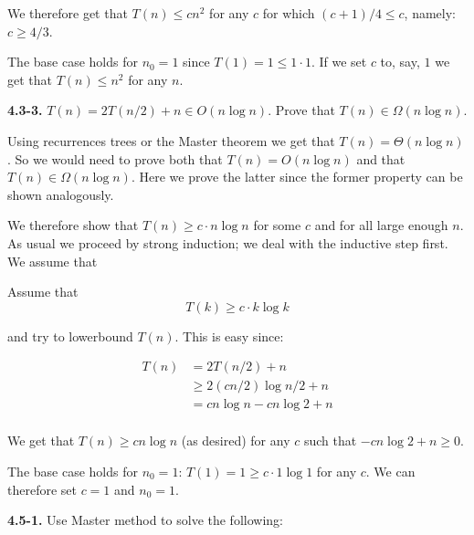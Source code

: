 \documentclass{article}
\newcommand{\Oh}{O}
\renewcommand{\leq}{\leqslant}
\renewcommand{\geq}{\geqslant}
\begin{document}
We therefore get that $T(n) \leq cn^2$ for any $c$ for which $(c+1)/4 \leq c$, namely: $c \geq 4/3$. 

The base case holds for $n_0=1$ since $T(1) = 1 \leq 1 \cdot 1$. If we set $c$ to, say, $1$ we get that $T(n) \leq n^2$ for any $n$.


\noindent\textbf{4.3-3.} $T(n) = 2T(n / 2) + n \in O(n \log{n})$. Prove that $T(n) \in \Omega(n \log{n})$.

Using recurrences trees or the Master theorem we get that $T(n) = \Theta(n \log n)$. So we would need to prove both that $T(n) = \Oh(n \log n)$ and that $T(n) \in \Omega(n \log n)$. Here we prove the latter since the former property can be shown analogously.

We therefore show that $T(n) \geq c \cdot n \log n$ for some $c$ and for all large enough $n$. As usual we proceed by strong induction; we deal with the inductive step first. We assume that

Assume that
\begin{equation*}
\label{eq-third}
T(k) \geq c \cdot k \log{k}
\end{equation*}

and try to lowerbound $T(n)$. This is easy since:

\begin{equation*}
\label{eq-v2}
\begin{split}
	T(n) &= 2T(n/2) + n \\
		& \geq 2 (cn/2) \log{n/2} + n \\
		&= cn\log{n} - cn\log{2} + n \\
\end{split}
\end{equation*}

We get that $T(n) \geq cn \log n$ (as desired) for any $c$ such that $-cn \log 2 + n \geq 0$.

The base case holds for $n_0 = 1$: $T(1) = 1 \geq c \cdot 1 \log{1}$ for any $c$. We can therefore set $c = 1$ and $n_0 = 1$.

\noindent\textbf{4.5-1.} Use Master method to solve the following:
\end{document}
